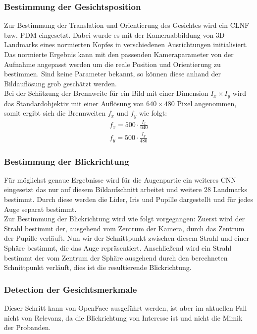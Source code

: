 \subsubsection{Bestimmung der Gesichtsposition}
Zur Bestimmung der Translation und Orientierung des Gesichtes wird ein CLNF bzw. PDM eingesetzt. Dabei wurde es mit der Kameraabbildung von 3D-Landmarks eines normierten Kopfes in verschiedenen Ausrichtungen initialisiert. Das normierte Ergebnis kann mit den passenden Kameraparameter von der Aufnahme angepasst werden um die reale Position und Orientierung zu bestimmen. Sind keine Parameter bekannt, so können diese anhand der Bildauflösung grob geschätzt werden.\\
Bei der Schätzung der Brennweite für ein Bild mit einer Dimension $I_x\times I_y$ wird das Standardobjektiv mit einer Auflösung von $640 \times 480$ Pixel angenommen, somit ergibt sich die Brennweiten $f_x$ und $f_y$ wie folgt:
\begin{align*}
f_x = 500\cdot \frac{I_x}{640}\\
f_y = 500\cdot \frac{I_y}{480}
\end{align*}
\subsubsection{Bestimmung der Blickrichtung}
\label{OpenFace_Blickrichtung}
Für möglichst genaue Ergebnisse wird für die Augenpartie ein weiteres CNN eingesetzt das nur auf diesem Bildaufschnitt arbeitet und weitere 28 Landmarks bestimmt. Durch diese werden die Lider, Iris und Pupille dargestellt und für jedes Auge separat bestimmt.\\
Zur Bestimmung der Blickrichtung wird wie folgt vorgegangen: Zuerst wird der Strahl bestimmt der, ausgehend vom Zentrum der Kamera, durch das Zentrum der Pupille verläuft. Nun wir der Schnittpunkt zwischen diesem Strahl und einer Sphäre bestimmt, die das Auge repräsentiert. Anschließend wird ein Strahl bestimmt der vom Zentrum der Sphäre ausgehend durch den berechneten Schnittpunkt verläuft, dies ist die resultierende Blickrichtung.
\subsubsection{Detection der Gesichtsmerkmale}
Dieser Schritt kann von OpenFace ausgeführt werden, ist aber im aktuellen Fall nicht von Relevanz, da die Blickrichtung von Interesse ist und nicht die Mimik der Probanden.
